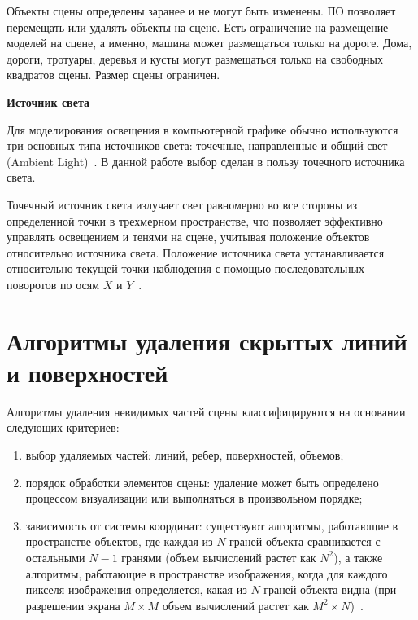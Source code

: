 Объекты сцены определены заранее и не могут быть изменены. ПО позволяет перемещать или удалять объекты на сцене. Есть ограничение на размещение моделей на сцене, а именно, машина может размещаться только на дороге. Дома, дороги, тротуары, деревья и кусты могут размещаться только на свободных квадратов сцены. Размер сцены ограничен.

\textbf{Источник света}

Для моделирования освещения в компьютерной графике обычно используются три основных типа источников света: точечные, направленные и общий свет (Ambient Light)~\cite{light}.
В данной работе выбор сделан в пользу точечного источника света.

Точечный источник света излучает свет равномерно во все стороны из определенной точки в трехмерном пространстве, что позволяет эффективно управлять освещением и тенями на сцене, учитывая положение объектов относительно источника света.
Положение источника света устанавливается относительно текущей точки наблюдения с помощью последовательных поворотов по осям $X$ и $Y$~\cite{light}.

\section{Алгоритмы удаления скрытых линий и поверхностей}




Алгоритмы удаления невидимых частей сцены классифицируются на основании следующих критериев:

\begin{enumerate}
	\item выбор удаляемых частей: линий, ребер, поверхностей, объемов;
	\item порядок обработки элементов сцены: удаление может быть определено процессом визуализации или выполняться в произвольном порядке;
	\item зависимость от системы координат: существуют алгоритмы, работающие в пространстве объектов, где каждая из $N$ граней объекта сравнивается с остальными $N - 1$ гранями (объем вычислений растет как $N^2$), а также алгоритмы, работающие в пространстве изображения, когда для каждого пикселя изображения определяется, какая из $N$ граней объекта видна (при разрешении экрана $M\times{M}$ объем вычислений растет как $M^2 \times N$)~\cite{del_line}.
\end{enumerate}

